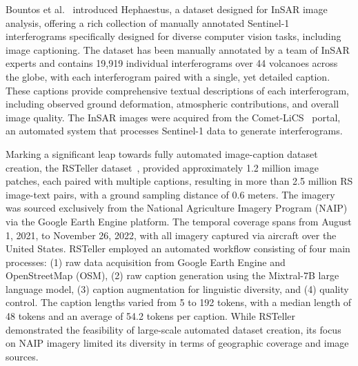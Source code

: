 Bountos et al.~\cite{Bountos_2022_CVPR} introduced Hephaestus, a dataset designed for InSAR image analysis, offering a rich collection of manually annotated Sentinel-1 interferograms specifically designed for diverse computer vision tasks, including image captioning. The dataset has been manually annotated by a team of InSAR experts and contains 19,919 individual interferograms over 44 volcanoes across the globe, with each interferogram paired with a single, yet detailed caption. These captions provide comprehensive textual descriptions of each interferogram, including observed ground deformation, atmospheric contributions, and overall image quality. The InSAR images were acquired from the Comet-LiCS~\cite{lazecky2020licsar} portal, an automated system that processes Sentinel-1 data to generate interferograms.

Marking a significant leap towards fully automated image-caption dataset creation, the RSTeller dataset~\cite{ge2024rsteller}, provided approximately 1.2 million image patches, each paired with multiple captions, resulting in more than 2.5 million RS image-text pairs, with a ground sampling distance of 0.6 meters. The imagery was sourced exclusively from the National Agriculture Imagery Program (NAIP) via the Google Earth Engine platform. The temporal coverage spans from August 1, 2021, to November 26, 2022, with all imagery captured via aircraft over the United States. RSTeller employed an automated workflow consisting of four main processes: (1) raw data acquisition from Google Earth Engine and OpenStreetMap (OSM), (2) raw caption generation using the Mixtral-7B large language model, (3) caption augmentation for linguistic diversity, and (4) quality control. The caption lengths varied from 5 to 192 tokens, with a median length of 48 tokens and an average of 54.2 tokens per caption. While RSTeller demonstrated the feasibility of large-scale automated dataset creation, its focus on NAIP imagery limited its diversity in terms of geographic coverage and image sources.

